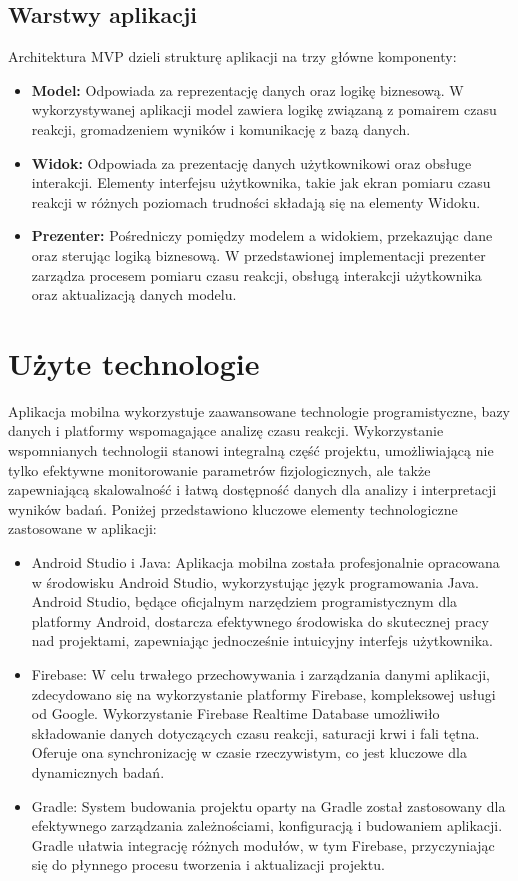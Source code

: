 \subsection{Warstwy aplikacji}
Architektura MVP dzieli strukturę aplikacji na trzy główne komponenty: 
\begin{itemize}
    \item \textbf{Model:} Odpowiada za reprezentację danych oraz logikę biznesową. W wykorzystywanej aplikacji model zawiera logikę związaną z pomairem czasu reakcji, gromadzeniem wyników i komunikację z bazą danych.
    \item \textbf{Widok:} Odpowiada za prezentację danych użytkownikowi oraz obsługe interakcji. Elementy interfejsu użytkownika, takie jak ekran pomiaru czasu reakcji w różnych poziomach trudności składają się na elementy Widoku.
    \item \textbf{Prezenter:} Pośredniczy pomiędzy modelem a widokiem, przekazując dane oraz sterując logiką biznesową. W przedstawionej implementacji prezenter zarządza procesem pomiaru czasu reakcji, obsługą interakcji użytkownika oraz aktualizacją danych modelu.
\end{itemize}

\section{Użyte technologie}
Aplikacja mobilna wykorzystuje zaawansowane technologie programistyczne, bazy danych i platformy wspomagające analizę czasu reakcji. Wykorzystanie wspomnianych technologii stanowi integralną część projektu, umożliwiającą nie tylko efektywne monitorowanie parametrów fizjologicznych, ale także zapewniającą skalowalność i łatwą dostępność danych dla analizy i interpretacji wyników badań. Poniżej przedstawiono kluczowe elementy technologiczne zastosowane w aplikacji:
\begin{itemize}
    \item Android Studio i Java: Aplikacja mobilna została profesjonalnie opracowana w środowisku Android Studio, wykorzystując język programowania Java. Android Studio, będące oficjalnym narzędziem programistycznym dla platformy Android, dostarcza efektywnego środowiska do skutecznej pracy nad projektami, zapewniając jednocześnie intuicyjny interfejs użytkownika.
    \item Firebase: W celu trwałego przechowywania i zarządzania danymi aplikacji, zdecydowano się na wykorzystanie platformy Firebase, kompleksowej usługi od Google. Wykorzystanie Firebase Realtime Database \cite{firebase} umożliwiło składowanie danych dotyczących czasu reakcji, saturacji krwi i fali tętna. Oferuje ona synchronizację w czasie rzeczywistym, co jest kluczowe dla dynamicznych badań.
    \item Gradle: System budowania projektu oparty na Gradle został zastosowany dla efektywnego zarządzania zależnościami, konfiguracją i budowaniem aplikacji. Gradle ułatwia integrację różnych modułów, w tym Firebase, przyczyniając się do płynnego procesu tworzenia i aktualizacji projektu.
\end{itemize}
